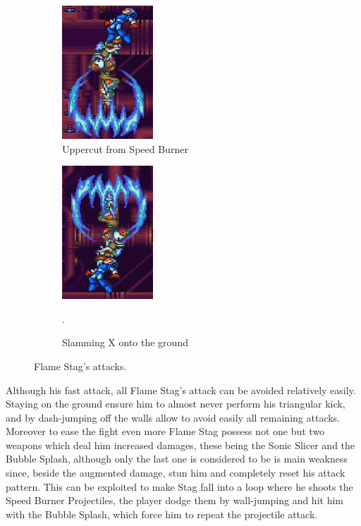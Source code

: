 \begin{figure}
	\ContinuedFloat
	\centering
	\begin{subfigure}[t]{0.4\linewidth}
		\centering
		\includegraphics[height=5cm]{figures/X2/Flame_stag/Stag_uppercut.png}
		\caption{Uppercut from Speed Burner}
	\end{subfigure}
	\begin{subfigure}[t]{0.4\linewidth}
		\centering
		\includegraphics[height=5cm]{figures/X2/Flame_stag/Stag_descend.png}
		\caption{Slamming X onto the ground}.
	\end{subfigure}
	\caption{Flame Stag's attacks.}
\end{figure}

Although his fast attack, all Flame Stag's attack can be avoided relatively easily. Staying on the ground ensure him to almost never perform his triangular kick, and by dash-jumping off the walls allow to avoid easily all remaining attacks. Moreover to ease the fight even more Flame Stag possess not one but two weapons which deal him increased damages, these being the Sonic Slicer and the Bubble Splash, although only the last one is considered to be is main weakness since, beside the augmented damage, stun him and completely reset his attack pattern. This can be exploited to make Stag fall into a loop where he shoots the Speed Burner Projectiles, the player dodge them by wall-jumping and hit him with the Bubble Splash, which force him to repeat the projectile attack.

